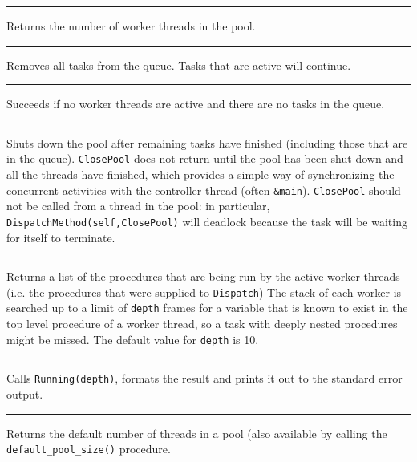 \bigskip\hrule\vspace{0.1cm}
\noindent{}

Returns the number of worker threads in the pool.\\

\bigskip\hrule\vspace{0.1cm}
\noindent{}

Removes all tasks from the queue. Tasks that are active will continue.

\bigskip\hrule\vspace{0.1cm}
\noindent{}

Succeeds if no worker threads are active and there are no tasks in the queue.\\

\bigskip\hrule\vspace{0.1cm}
\noindent{}

Shuts down the pool after remaining tasks have finished
(including those that are in the queue). \texttt{ClosePool} does not return
until the pool has been shut down and all the threads have finished, which
provides a simple way of synchronizing the concurrent activities with the
controller thread (often \texttt{\&main}).
\texttt{ClosePool} should not be called from a thread in the pool: in particular,
\texttt{DispatchMethod(self,ClosePool)} will deadlock because the task will be
waiting for itself to terminate.\\

\bigskip\hrule\vspace{0.1cm}
\noindent{}

Returns a list of the procedures that are being run by the active worker threads
(i.e. the procedures that were supplied to \texttt{Dispatch}) The stack of each
worker is searched up to a limit of \texttt{depth} frames for a variable that is
known to exist in the top level procedure of a worker thread, so a task with deeply
nested procedures might be missed. The default value for \texttt{depth} is 10.\\

\bigskip\hrule\vspace{0.1cm}
\noindent{}

Calls \texttt{Running(depth)}, formats the result and prints it out to the
standard error output.

\bigskip\hrule\vspace{0.1cm}
\noindent{}

Returns the default number of threads in a pool (also available by calling the
\linebreak%
\texttt{default\_pool\_size()} procedure.

